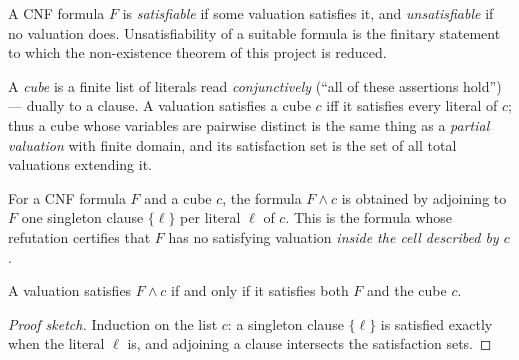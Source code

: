 \begin{definition}[Satisfiability]\label{def:cnf-unsat}
A CNF formula $F$ is \emph{satisfiable} if some valuation satisfies it, and
\emph{unsatisfiable} if no valuation does.  Unsatisfiability of a suitable
formula is the finitary statement to which the non-existence theorem of this
project is reduced.
\leanok
{}
\end{definition}

\begin{definition}\label{def:cnf-cube}
A \emph{cube} is a finite list of literals read \emph{conjunctively}
(``all of these assertions hold'') --- dually to a clause.  A valuation
satisfies a cube $c$ iff it satisfies every literal of $c$; thus a cube
whose variables are pairwise distinct is the same thing as a \emph{partial
valuation} with finite domain, and its satisfaction set is the set of all
total valuations extending it.
\leanok
{}
\end{definition}

\begin{definition}\label{def:cnf-withcube}
For a CNF formula $F$ and a cube $c$, the formula $F \wedge c$ is obtained
by adjoining to $F$ one singleton clause $\{\ell\}$ per literal $\ell$ of
$c$.  This is the formula whose refutation certifies that $F$ has no
satisfying valuation \emph{inside the cell described by $c$}.
\leanok
{}
\end{definition}

\begin{lemma}\label{lem:cnf-withcube-eval}
A valuation satisfies $F \wedge c$ if and only if it satisfies both $F$ and
the cube $c$.
\leanok
{}
\end{lemma}
\begin{proof}[Proof sketch]
Induction on the list $c$: a singleton clause $\{\ell\}$ is satisfied
exactly when the literal $\ell$ is, and adjoining a clause intersects the
satisfaction sets.
\end{proof}

